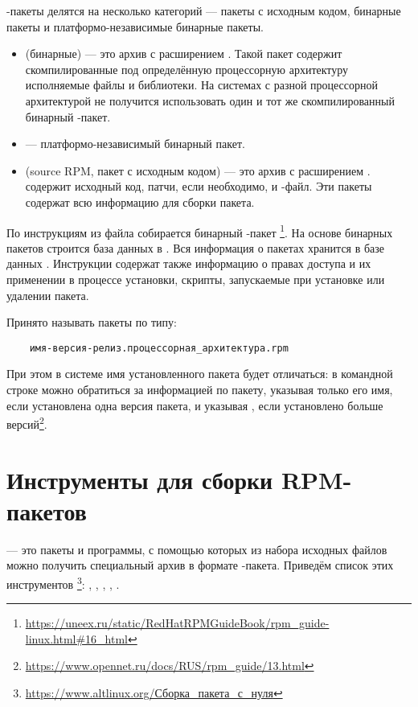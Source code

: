 -пакеты делятся на несколько категорий --- пакеты с исходным кодом, бинарные пакеты и платформо-независимые 
бинарные пакеты.
\begin{itemize}
	\item {} (бинарные) --- это архив с расширением . Такой пакет содержит 
		скомпилированные под определённую процессорную архитектуру исполняемые файлы и библиотеки. 
		На системах с разной процессорной архитектурой не получится использовать один и тот же 
		скомпилированный бинарный -пакет.
	\item {} --- платформо-независимый бинарный пакет.
	\item {} (source RPM, пакет с исходным кодом) --- это архив с расширением . 
		 содержит исходный код, патчи, если необходимо, и -файл. Эти пакеты содержат 
		всю информацию для сборки пакета.
\end{itemize}

По инструкциям из  файла собирается бинарный -пакет%
\footnote{\href{https://uneex.ru/static/RedHatRPMGuideBook/rpm_guide-linux.html\#16_html}{https://uneex.ru/static/RedHatRPMGuideBook/rpm\_guide-linux.html\#16\_html}}. 
На основе бинарных пакетов строится база данных в . Вся информация о пакетах хранится в базе 
данных . Инструкции содержат также информацию о правах доступа и их применении в процессе установки, 
скрипты, запускаемые при установке или удалении пакета.

Принято называть пакеты  по типу:
\begin{verbatim}
	имя-версия-релиз.процессорная_архитектура.rpm
\end{verbatim}

При этом в системе имя установленного пакета будет отличаться: в командной строке можно обратиться за информацией 
по пакету, указывая только его имя, если установлена одна версия пакета, и указывая , если 
установлено больше версий\footnote{\href{https://www.opennet.ru/docs/RUS/rpm_guide/13.html}{https://www.opennet.ru/docs/RUS/rpm\_guide/13.html}}.


\section{Инструменты для сборки RPM-пакетов}
 --- это пакеты и программы, с помощью которых из набора исходных файлов 
можно получить специальный архив в формате -пакета. Приведём список этих инструментов%
\footnote{\href{https://www.altlinux.org/\%D0\%A1\%D0\%B1\%D0\%BE\%D1\%80\%D0\%BA\%D0\%B0_\%D0\%BF\%D0\%B0\%D0\%BA\%D0\%B5\%D1\%82\%D0\%B0_\%D1\%81_\%D0\%BD\%D1\%83\%D0\%BB\%D1\%8F}%
{https://www.altlinux.org/Сборка\_пакета\_с\_нуля}}: , , , , . 

